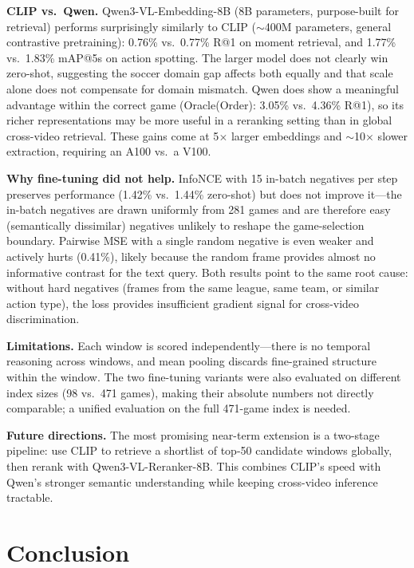 \documentclass[10pt,twocolumn]{article}
\begin{document}
\noindent\textbf{CLIP vs.\ Qwen.}
Qwen3-VL-Embedding-8B (8B parameters, purpose-built for retrieval) performs surprisingly similarly to CLIP (${\sim}$400M parameters, general contrastive pretraining): 0.76\% vs.\ 0.77\% R@1 on moment retrieval, and 1.77\% vs.\ 1.83\% mAP@5s on action spotting. The larger model does not clearly win zero-shot, suggesting the soccer domain gap affects both equally and that scale alone does not compensate for domain mismatch. Qwen does show a meaningful advantage within the correct game (Oracle(Order): 3.05\% vs.\ 4.36\% R@1), so its richer representations may be more useful in a reranking setting than in global cross-video retrieval. These gains come at 5$\times$ larger embeddings and ${\sim}$10$\times$ slower extraction, requiring an A100 vs.\ a V100.

\noindent\textbf{Why fine-tuning did not help.}
InfoNCE with 15 in-batch negatives per step preserves performance (1.42\% vs.\ 1.44\% zero-shot) but does not improve it---the in-batch negatives are drawn uniformly from 281 games and are therefore easy (semantically dissimilar) negatives unlikely to reshape the game-selection boundary. Pairwise MSE with a single random negative is even weaker and actively hurts (0.41\%), likely because the random frame provides almost no informative contrast for the text query. Both results point to the same root cause: without hard negatives (frames from the same league, same team, or similar action type), the loss provides insufficient gradient signal for cross-video discrimination.

\noindent\textbf{Limitations.}
Each window is scored independently---there is no temporal reasoning across windows, and mean pooling discards fine-grained structure within the window. The two fine-tuning variants were also evaluated on different index sizes (98 vs.\ 471 games), making their absolute numbers not directly comparable; a unified evaluation on the full 471-game index is needed.

\noindent\textbf{Future directions.}
The most promising near-term extension is a two-stage pipeline: use CLIP to retrieve a shortlist of top-50 candidate windows globally, then rerank with Qwen3-VL-Reranker-8B. This combines CLIP's speed with Qwen's stronger semantic understanding while keeping cross-video inference tractable.

\section{Conclusion}
\end{document}
